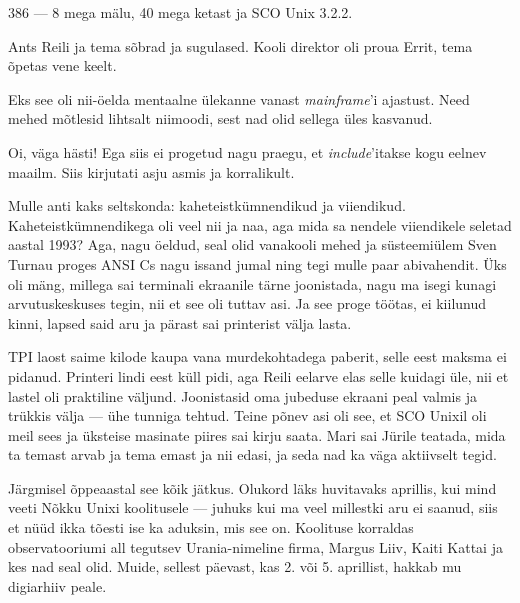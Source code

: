 
386 --- 8 mega mälu, 40 mega ketast ja SCO Unix 3.2.2. 


Ants Reili ja tema sõbrad ja sugulased. Kooli direktor 
oli proua Errit, tema õpetas vene keelt. 

Eks see oli nii-öelda mentaalne ülekanne vanast \emph{mainframe}'i ajastust. Need mehed mõtlesid lihtsalt niimoodi, sest nad olid sellega üles 
kasvanud. 


Oi, väga hästi! Ega siis ei progetud nagu praegu, et \emph{include}'itakse 
kogu eelnev maailm. Siis kirjutati asju asmis ja korralikult. 

Mulle anti kaks seltskonda: kaheteistkümnendikud ja viiendikud. 
Kaheteistkümnendikega oli veel nii ja naa, aga mida sa nendele viiendikele seletad 
aastal 1993? Aga, nagu öeldud, 
seal olid vanakooli mehed ja süsteemiülem
Sven Turnau proges ANSI Cs 
nagu issand jumal ning tegi mulle paar abivahendit. Üks oli mäng, millega 
sai terminali ekraanile tärne joonistada, nagu ma isegi kunagi arvutuskeskuses 
tegin, nii et see oli tuttav asi. Ja see proge töötas, ei kiilunud kinni, lapsed said aru ja pärast sai printerist välja lasta. 

TPI laost saime kilode kaupa vana murdekohtadega paberit, selle 
eest maksma ei pidanud. Printeri lindi eest küll pidi, aga Reili eelarve elas 
selle kuidagi üle, nii et lastel oli praktiline väljund. 
Joonistasid oma jubeduse ekraani peal valmis ja trükkis välja --- ühe tunniga 
tehtud. Teine põnev asi oli see, et SCO Unixil oli meil
sees ja üksteise masinate piires sai kirju saata. Mari sai Jürile 
teatada, mida ta temast arvab ja tema emast ja nii edasi, ja seda nad ka väga 
aktiivselt tegid. 

Järgmisel õppeaastal see kõik jätkus. Olukord läks huvitavaks 
aprillis, kui mind veeti Nõkku Unixi 
koolitusele --- juhuks kui ma veel millestki aru ei saanud, siis et nüüd ikka 
tõesti ise ka aduksin, mis see on. Koolituse korraldas observatooriumi all tegutsev Urania-nimeline firma, Margus Liiv, Kaiti 
Kattai ja kes nad seal olid. Muide, sellest päevast, kas 2. või 5. aprillist, 
hakkab mu digiarhiiv peale.  

